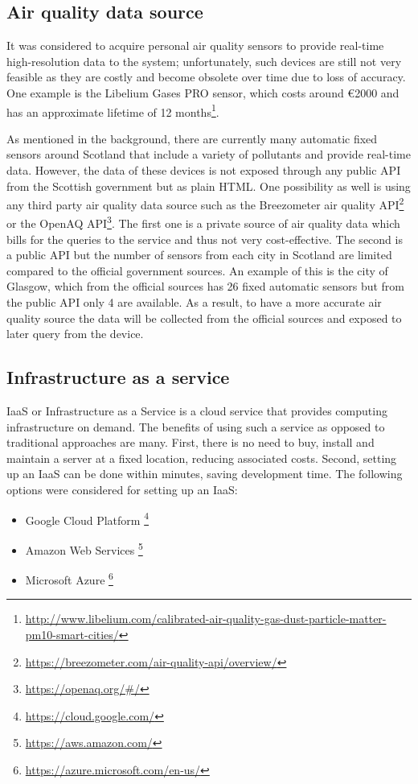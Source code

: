 \subsection{Air quality data source}
It was considered to acquire personal air quality sensors to provide real-time high-resolution data to the system; unfortunately, such devices are still not very feasible as they are costly and become obsolete over time due to loss of accuracy. One example is the Libelium Gases PRO sensor, which costs around \euro{}2000 and has an approximate lifetime of 12 months\footnote{\url{http://www.libelium.com/calibrated-air-quality-gas-dust-particle-matter-pm10-smart-cities/}}. 

As mentioned in the background, there are currently many automatic fixed sensors around Scotland that include a variety of pollutants and provide real-time data. However, the data of these devices is not exposed through any public API from the Scottish government but as plain HTML. One possibility as well is using any third party air quality data source such as the Breezometer air quality API\footnote{\url{https://breezometer.com/air-quality-api/overview/}} or the OpenAQ API\footnote{\url{https://openaq.org/#/}}. The first one is a private source of air quality data which bills for the queries to the service and thus not very cost-effective. The second is a public API but the number of sensors from each city in Scotland are limited compared to the official government sources. An example of this is the city of Glasgow, which from the official sources has 26 fixed automatic sensors but from the public API only 4 are available. As a result, to have a more accurate air quality source the data will be collected from the official sources and exposed to later query from the device. 


\subsection{Infrastructure as a service}

IaaS or Infrastructure as a Service is a cloud service that provides computing infrastructure on demand. The benefits of using such a service as opposed to traditional approaches are many. First, there is no need to buy, install and maintain a server at a fixed location, reducing associated costs. Second, setting up an IaaS can be done within minutes, saving  development time. The following options were considered for setting up an IaaS: 

\begin{itemize}
	\item Google Cloud Platform \footnote{\url{https://cloud.google.com/}}
    \item Amazon Web Services \footnote{\url{https://aws.amazon.com/}}
    \item Microsoft Azure \footnote{\url{https://azure.microsoft.com/en-us/}}
\end{itemize}

